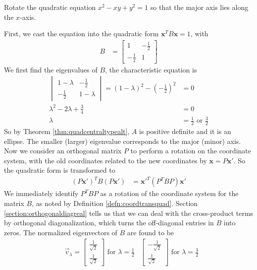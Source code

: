 \begin{exmp}
Rotate the quadratic equation $x^2 - xy + y^2 = 1$ so that the major axis lies along the $x$-axis.
\end{exmp}
First, we cast the equation into the quadratic form $\textbf{x}^T B\textbf{x} = 1$, with
\begin{align*}
B &=
\begin{bmatrix}
1 & -\frac{1}{2} \\
-\frac{1}{2} & 1
\end{bmatrix}
\end{align*}
We first find the eigenvalues of $B$, the characteristic equation is
\begin{align*}
\begin{vmatrix}
1-\lambda & -\frac{1}{2} \\
-\frac{1}{2} & 1-\lambda
\end{vmatrix} = (1-\lambda)^2 - (-\frac{1}{2})^2 &= 0 \\
\lambda^2 - 2\lambda + \frac{3}{4} &= 0 \\
\lambda &= \frac{1}{2} \text{ or } \frac{3}{2}
\end{align*}
So by Theorem \ref{thm:quadcentraltypealt}, $A$ is positive definite and it is an ellipse. The smaller (larger) eigenvalue corresponds to the major (minor) axis. Now we consider an orthogonal matrix $P$ to perform a rotation on the coordinate system, with the old coordinates related to the new coordinates by $\textbf{x} = P\textbf{x}'$. So the quadratic form is transformed to
\begin{align*}
(P\textbf{x}')^T B (P\textbf{x}') &= \textbf{x}'^T (P^T BP) \textbf{x}'
\end{align*}
We immediately identify $P^T BP$ as a rotation of the coordinate system for the matrix $B$, as noted by Definition \ref{defn:coordtransquad}. Section \ref{section:orthogonaldiagreal} tells us that we can deal with the cross-product terms by orthogonal diagonalization, which turns the off-diagonal entries in $B$ into zeros. The normalized eigenvectors of $B$ are found to be
\begin{align*}
&\vec{v}_\lambda = \begin{bmatrix}
\frac{1}{\sqrt{2}} \\
\frac{1}{\sqrt{2}}
\end{bmatrix}
\text{ for } \lambda = \frac{1}{2}
& \begin{bmatrix}
-\frac{1}{\sqrt{2}} \\
\frac{1}{\sqrt{2}}
\end{bmatrix}
\text{ for } \lambda = \frac{3}{2}
\end{align*}
